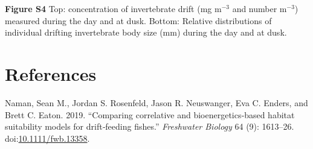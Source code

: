 \documentclass[]{article}
\begin{document}
\textbf{Figure S4} Top: concentration of invertebrate drift (mg
m\(^{-3}\) and number m\(^{-3}\)) measured during the day and at dusk.
Bottom: Relative distributions of individual drifting invertebrate body
size (mm) during the day and at dusk.

\section*{References}\label{references}

\hypertarget{refs}{}
\hypertarget{ref-Naman2019}{}
Naman, Sean M., Jordan S. Rosenfeld, Jason R. Neuswanger, Eva C. Enders,
and Brett C. Eaton. 2019. ``Comparing correlative and
bioenergetics‐based habitat suitability models for drift‐feeding
fishes.'' \emph{Freshwater Biology} 64 (9): 1613--26.
doi:\href{https://doi.org/10.1111/fwb.13358}{10.1111/fwb.13358}.
\end{document}

